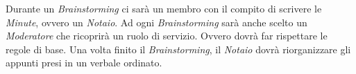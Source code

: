 \documentclass[a4paper]{report}
\begin{document}
		Durante un \emph{Brainstorming} ci sarà un membro con il compito di scrivere le \emph{Minute}, ovvero un \emph{Notaio}. 
		Ad ogni \emph{Brainstorming} sarà anche scelto un \emph{Moderatore} che ricoprirà un ruolo di servizio. Ovvero dovrà far 
		rispettare le regole di base. Una volta finito il \emph{Brainstorming}, il \emph{Notaio} dovrà riorganizzare gli appunti
		presi in un verbale ordinato.
	
	\cleardoublepage
	\listoffigures
	
	\cleardoublepage
	\listoftables
	
\end{document}
